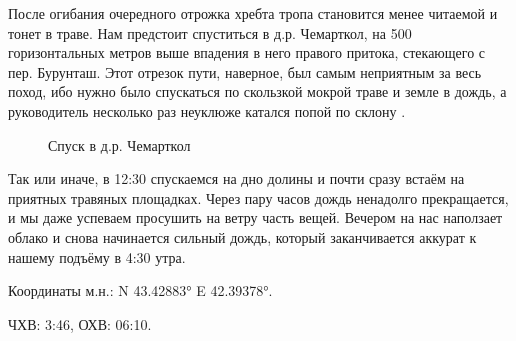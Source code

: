 После огибания очередного отрожка хребта тропа становится менее читаемой и тонет в траве. Нам предстоит спуститься в д.р. Чемарткол, на 500 горизонтальных метров выше впадения в него правого притока, стекающего с пер. Бурунташ. Этот отрезок пути, наверное, был самым неприятным за весь поход, ибо нужно было спускаться по скользкой мокрой траве и земле в дождь, а руководитель несколько раз неуклюже катался попой по склону \smiley.

\begin{figure}[h!]
	\centering
	\caption{Спуск в д.р. Чемарткол}
	\label{fig:downhill}
\end{figure}



Так или иначе, в 12:30 спускаемся на дно долины и почти сразу встаём на приятных травяных площадках. Через пару часов дождь ненадолго прекращается, и мы даже успеваем просушить на ветру часть вещей. Вечером на нас наползает облако и снова начинается сильный дождь, который заканчивается аккурат к нашему подъёму в 4:30 утра.

Координаты м.н.: N 43.42883° E 42.39378°.

ЧХВ: 3:46, ОХВ: 06:10.
											
\clearpage